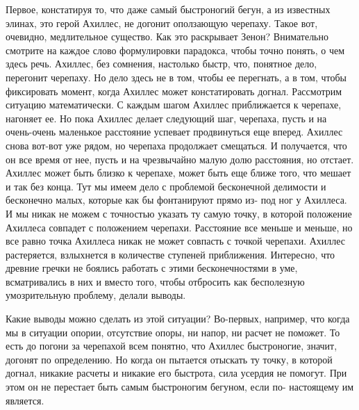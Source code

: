 Первое, констатируя то, что даже самый быстроногий бегун, а из известных элинах,
это герой Ахиллес, не догонит оползающую черепаху. Такое вот, очевидно,
медлительное существо. Как это раскрывает Зенон? Внимательно смотрите на каждое
слово формулировки парадокса, чтобы точно понять, о чем здесь речь. Ахиллес, без
сомнения, настолько быстр, что, понятное дело, перегонит черепаху. Но дело здесь
не в том, чтобы ее перегнать, а в том, чтобы фиксировать момент, когда Ахиллес
может констатировать догнал. Рассмотрим ситуацию математически. С каждым шагом
Ахиллес приближается к черепахе, нагоняет ее. Но пока Ахиллес делает следующий
шаг, черепаха, пусть и на очень-очень маленькое расстояние успевает продвинуться
еще вперед. Ахиллес снова вот-вот уже рядом, но черепаха продолжает смещаться. И
получается, что он все время от нее, пусть и на чрезвычайно малую долю
расстояния, но отстает. Ахиллес может быть близко к черепахе, может быть еще
ближе того, что мешает и так без конца. Тут мы имеем дело с проблемой
бесконечной делимости и бесконечно малых, которые как бы фонтанируют прямо из-
под ног у Ахиллеса. И мы никак не можем с точностью указать ту самую точку, в
которой положение Ахиллеса совпадет с положением черепахи. Расстояние все меньше
и меньше, но все равно точка Ахиллеса никак не может совпасть с точкой черепахи.
Ахиллес растеряется, взлыхнется в количестве ступеней приближения. Интересно,
что древние гречки не боялись работать с этими бесконечностями в уме,
всматривались в них и вместо того, чтобы отбросить как бесполезную умозрительную
проблему, делали выводы. 

Какие выводы можно сделать из этой ситуации? Во-первых,
например, что когда мы в ситуации опории, отсутствие опоры, ни напор, ни расчет
не поможет. То есть до погони за черепахой всем понятно, что Ахиллес
быстроногие, значит, догонят по определению. Но когда он пытается отыскать ту
точку, в которой догнал, никакие расчеты и никакие его быстрота, сила усердия не
помогут. При этом он не перестает быть самым быстроногим бегуном, если по-
настоящему им является. 


